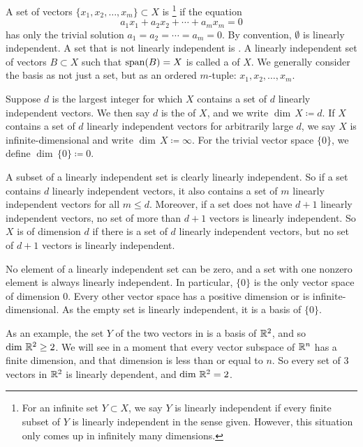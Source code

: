 \begin{defn}
A set of vectors $\{ x_1, x_2, \ldots, x_m \} \subset X$ is 
\emph{}\footnote{%
For an infinite set $Y \subset X$, we say $Y$ is linearly
independent if every finite subset of $Y$ is linearly independent
in the sense given.
However, this situation only comes up in infinitely many dimensions.}
if the equation
\begin{equation} \label{eq:lincomb}
a_1 x_1 + a_2 x_2 + \cdots + a_m x_m = 0
\end{equation}
has only the trivial solution $a_1 = a_2 = \cdots = a_m = 0$.
By convention, $\emptyset$ is linearly independent.
A set that is not linearly independent is
\emph{}.
%
A linearly independent set of vectors $B \subset X$ such that
$\operatorname{span}(B) = X$ 
is called a \emph{} of $X$.
We generally consider the basis as not just a set, but as
an ordered $m$-tuple:
$x_1,x_2,\ldots,x_m$.

Suppose $d$ is the largest integer for which $X$ contains a set of
$d$ linearly independent vectors.  We then say $d$ is
the \emph{} of $X$,
and we write $\dim \, X \coloneqq d$.
If $X$ contains a set of $d$ linearly independent vectors 
for arbitrarily large $d$, we say
$X$ is infinite-dimensional and write $\dim \, X \coloneqq \infty$.
%
For the trivial vector space $\{ 0 \}$, we define $\dim \, \{ 0 \} \coloneqq 0$.
\end{defn}

A subset of a linearly independent set is clearly linearly independent.
So if a set contains $d$ linearly independent vectors, it also contains a
set of $m$ linearly independent vectors for all $m \leq d$.
Moreover, if a set does not have $d+1$
linearly independent vectors, no set of more than $d+1$ vectors is linearly
independent.
So $X$ is of dimension $d$ if there
is a set of $d$ linearly independent vectors, but no
set of $d+1$ vectors is linearly independent.

No element of a linearly independent set can be zero,
and a set with one nonzero element is always linearly independent.
In particular, $\{ 0 \}$ is the only vector space of dimension $0$.
Every other vector space has a positive dimension
or is infinite-dimensional.
As the empty set is linearly independent, it is a basis
of $\{ 0 \}$.

As an example, the
set $Y$ of the two vectors in
 is a basis of ${\mathbb{R}}^2$, and so
$\dim \, {\mathbb{R}}^2 \geq 2$.
We will see in a moment that every vector subspace of ${\mathbb{R}}^n$
has a finite dimension, and that dimension is less than or equal to $n$.
So every set of 3 vectors in ${\mathbb{R}}^2$ is linearly dependent, and
$\dim \, {\mathbb{R}}^2 = 2$.

